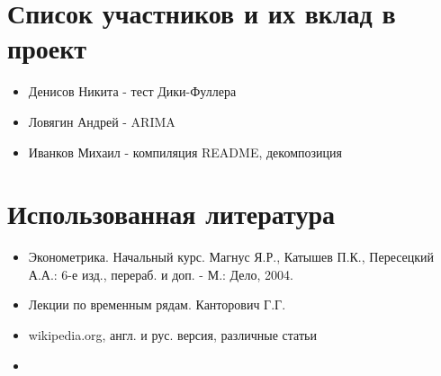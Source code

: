 \documentclass{article}
\begin{document}
\section{Список участников и их вклад в проект}

\begin{itemize}
    \item Денисов Никита - тест Дики-Фуллера
    \item Ловягин Андрей - ARIMA
    \item Иванков Михаил - компиляция README, декомпозиция
\end{itemize}{}

\section{Использованная литература}

\begin{itemize}
    \item Эконометрика. Начальный курс.  Магнус Я.Р., Катышев П.К., Пересецкий А.А.: 6-е изд., перераб. и доп. - М.: Дело, 2004.
    \item Лекции по временным рядам. Канторович Г.Г.
    \item wikipedia.org, англ. и рус. версия, различные статьи
    \item 
\end{itemize}
  
\end{document}
